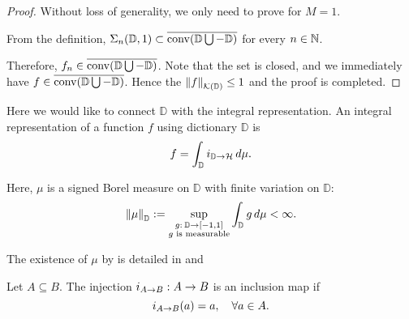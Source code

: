 \begin{proof}
    Without loss of generality, we only need to prove for $M = 1$.

    From the definition, $\Sigma_n(\mathbb{D}, 1) \subset
    \overline{\operatorname*{conv}({\mathbb{D}} \bigcup -{\mathbb{D}})}$ for every $n \in \mathbb{N}$. 
    
    Therefore, $f_n \in \overline{\operatorname*{conv}({\mathbb{D}} \bigcup -{\mathbb{D}})}$. Note that the set is
    closed, and we immediately have $f \in \overline{\operatorname*{conv}({\mathbb{D}} \bigcup -{\mathbb{D}})}$.
    Hence the $\left\| {f} \right\|_{\mathcal{K}({\mathbb{D}})} \leq 1$ and the proof is completed.
\end{proof}


Here we would like to connect $\mathbb{D}$ with the integral representation. An
integral representation of a function $f$ using dictionary $\mathbb{D}$ is
\begin{equation}
    f = \int_{\mathbb{D}} i_{{\mathbb{D}}\to{\mathcal{H}}} \,d\mu.
\end{equation}

Here, $\mu$ is a signed Borel measure on $\mathbb{D}$ with finite variation on $\mathbb{D}$:
\begin{equation}
    \label{eq:measure_set_variation}
    \left\| \mu \right\|_{\mathbb{D}} := \sup_{\substack{
            g: \:\mathbb{D} \to [-1, 1] \\ g \textnormal{ is measurable}
        }
    } \int_{\mathbb{D}} g\,d\mu < \infty.
\end{equation}

\begin{remark}
    The existence of $\mu$ by is detailed in \cite[Proposition
    2]{siegelCharacterizationVariationSpaces2022} and \citep[Chapter
    4]{diestelSequencesSeriesBanach1984}
\end{remark}

\begin{definition}
    \label{def:inclusionMap}
    Let $A \subseteq B$. The injection $i_{{A}\to{B}}: A\to B$ is an
    inclusion map if
    \begin{equation}
        i_{{A}\to{B}}(a) = a, \quad \forall a \in A.
    \end{equation}
\end{definition}

